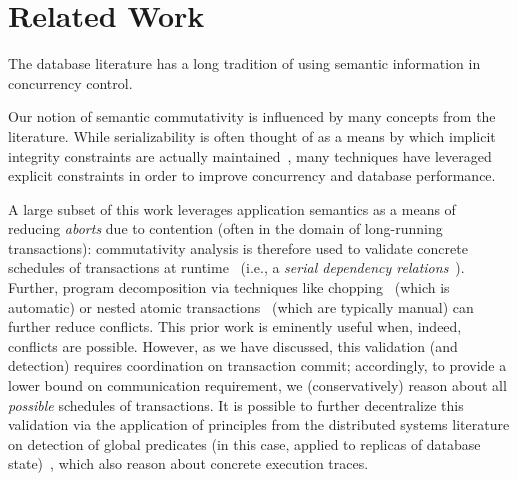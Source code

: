 
\section{Related Work}
\label{sec:relatedwork}


The database literature has a long tradition of using semantic
information in concurrency control.

 Our notion of semantic
commutativity is influenced by many concepts from the
literature. While serializability is often thought of as a means by
which implicit integrity constraints are actually
maintained~\cite{gray-virtues}, many techniques have leveraged
explicit constraints in order to improve concurrency and database
performance.

A large subset of this work leverages application semantics as a means
of reducing \textit{aborts} due to contention (often in the domain of
long-running transactions): commutativity analysis is therefore used
to validate concrete schedules of transactions at
runtime~\cite{weihl-thesis,badrinath-semantics} (i.e., a
\textit{serial dependency
  relations}~\cite{herlihy-apologizing}). Further, program
decomposition via techniques like chopping~\cite{chopping} (which is
automatic) or nested atomic transactions~\cite{atomictransactions}
(which are typically manual) can further reduce conflicts. This prior
work is eminently useful when, indeed, conflicts are
possible. However, as we have discussed, this validation (and
detection) requires coordination on transaction commit; accordingly,
to provide a lower bound on communication requirement, we
(conservatively) reason about all \textit{possible} schedules of
transactions.  It is possible to further decentralize this validation
via the application of principles from the distributed systems
literature on detection of global predicates (in this case, applied to
replicas of database state)~\cite{globalpredicates}, which also reason
about concrete execution traces.


